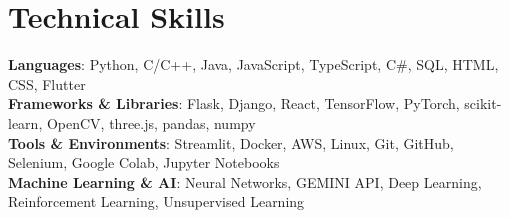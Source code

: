 \documentclass[letterpaper,10pt]{article}
\begin{document}
\section{Technical Skills}
 \begin{itemize}[leftmargin=0.15in, label={}]
    \small{\item{
     \textbf{Languages}{: Python, C/C++, Java, JavaScript, TypeScript, C\#, SQL, HTML, CSS, Flutter} \\
     \textbf{Frameworks \& Libraries}{: Flask, Django, React, TensorFlow, PyTorch, scikit-learn, OpenCV, three.js, pandas, numpy} \\
     \textbf{Tools \& Environments}{: Streamlit, Docker, AWS, Linux, Git, GitHub, Selenium, Google Colab, Jupyter Notebooks} \\
     \textbf{Machine Learning \& AI}{: Neural Networks, GEMINI API, Deep Learning, Reinforcement Learning, Unsupervised Learning} \\
    }}
 \end{itemize}
\end{document}

